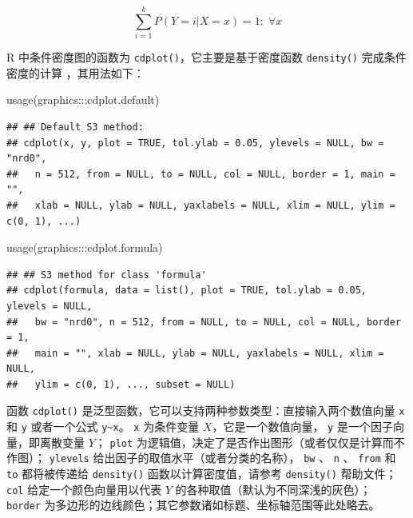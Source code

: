 \documentclass[
  b5paper,
  UTF8,twoside]{book}
\newenvironment{Shaded}{\begin{snugshade}}{\end{snugshade}}
\newcommand{\FunctionTok}[1]{\textcolor[rgb]{0.00,0.00,0.00}{#1}}
\newcommand{\NormalTok}[1]{#1}
\newcommand{\SpecialCharTok}[1]{\textcolor[rgb]{0.00,0.00,0.00}{#1}}
\begin{document}
\begin{equation} 
\sum_{i=1}^{k}P(Y=i|X=x)=1;\;\forall x
\label{eq:cdp}
\end{equation}

R 中条件密度图的函数为 \texttt{cdplot()}，它主要是基于密度函数 \texttt{density()} 完成条件密度的计算 \citep{Hofmann05}，其用法如下：

\begin{Shaded}
\begin{Highlighting}[]
\FunctionTok{usage}\NormalTok{(graphics}\SpecialCharTok{:::}\NormalTok{cdplot.default)}
\end{Highlighting}
\end{Shaded}

\begin{verbatim}
## ## Default S3 method:
## cdplot(x, y, plot = TRUE, tol.ylab = 0.05, ylevels = NULL, bw = "nrd0",
##   n = 512, from = NULL, to = NULL, col = NULL, border = 1, main = "",
##   xlab = NULL, ylab = NULL, yaxlabels = NULL, xlim = NULL, ylim = c(0, 1), ...)
\end{verbatim}

\begin{Shaded}
\begin{Highlighting}[]
\FunctionTok{usage}\NormalTok{(graphics}\SpecialCharTok{:::}\NormalTok{cdplot.formula)}
\end{Highlighting}
\end{Shaded}

\begin{verbatim}
## ## S3 method for class 'formula'
## cdplot(formula, data = list(), plot = TRUE, tol.ylab = 0.05, ylevels = NULL,
##   bw = "nrd0", n = 512, from = NULL, to = NULL, col = NULL, border = 1,
##   main = "", xlab = NULL, ylab = NULL, yaxlabels = NULL, xlim = NULL,
##   ylim = c(0, 1), ..., subset = NULL)
\end{verbatim}

函数 \texttt{cdplot()} 是泛型函数，它可以支持两种参数类型：直接输入两个数值向量 \texttt{x} 和 \texttt{y} 或者一个公式 \texttt{y\textasciitilde{}x}。 \texttt{x} 为条件变量 \(X\)，它是一个数值向量， \texttt{y} 是一个因子向量，即离散变量 \(Y\)； \texttt{plot} 为逻辑值，决定了是否作出图形（或者仅仅是计算而不作图）； \texttt{ylevels} 给出因子的取值水平（或者分类的名称）， \texttt{bw} 、 \texttt{n} 、 \texttt{from} 和 \texttt{to} 都将被传递给 \texttt{density()} 函数以计算密度值，请参考 \texttt{density()} 帮助文件； \texttt{col} 给定一个颜色向量用以代表 \(Y\) 的各种取值（默认为不同深浅的灰色）； \texttt{border} 为多边形的边线颜色；其它参数诸如标题、坐标轴范围等此处略去。
\end{document}
